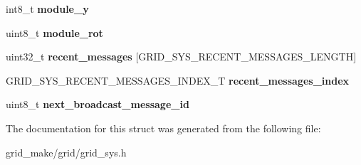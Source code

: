 \begin{DoxyCompactItemize}
\item 
\hypertarget{structgrid__sys__model_a5184c3981ca74162f540536109cdd492}{int8\-\_\-t {\bfseries module\-\_\-y}}\label{structgrid__sys__model_a5184c3981ca74162f540536109cdd492}

\item 
\hypertarget{structgrid__sys__model_a4025e6814e26ca279716cafd3e412382}{uint8\-\_\-t {\bfseries module\-\_\-rot}}\label{structgrid__sys__model_a4025e6814e26ca279716cafd3e412382}

\item 
\hypertarget{structgrid__sys__model_adc465a94f6db404197aa2a4f5cc247a6}{uint32\-\_\-t {\bfseries recent\-\_\-messages} \mbox{[}G\-R\-I\-D\-\_\-\-S\-Y\-S\-\_\-\-R\-E\-C\-E\-N\-T\-\_\-\-M\-E\-S\-S\-A\-G\-E\-S\-\_\-\-L\-E\-N\-G\-T\-H\mbox{]}}\label{structgrid__sys__model_adc465a94f6db404197aa2a4f5cc247a6}

\item 
\hypertarget{structgrid__sys__model_ac60b150545d2169c596f25a5ea99d419}{G\-R\-I\-D\-\_\-\-S\-Y\-S\-\_\-\-R\-E\-C\-E\-N\-T\-\_\-\-M\-E\-S\-S\-A\-G\-E\-S\-\_\-\-I\-N\-D\-E\-X\-\_\-\-T {\bfseries recent\-\_\-messages\-\_\-index}}\label{structgrid__sys__model_ac60b150545d2169c596f25a5ea99d419}

\item 
\hypertarget{structgrid__sys__model_a08d362697207ca3ee9084535e89c45ae}{uint8\-\_\-t {\bfseries next\-\_\-broadcast\-\_\-message\-\_\-id}}\label{structgrid__sys__model_a08d362697207ca3ee9084535e89c45ae}

\end{DoxyCompactItemize}


The documentation for this struct was generated from the following file\-:\begin{DoxyCompactItemize}
\item 
grid\-\_\-make/grid/grid\-\_\-sys.\-h\end{DoxyCompactItemize}
